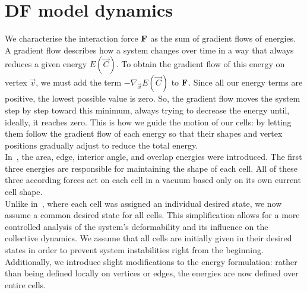 \section{DF model dynamics} 
We characterise the interaction force $\mathbf{F}$ as the sum of gradient flows of energies. \\
A gradient flow describes how a system changes over time in a way that always reduces a given energy $E(\vec{C})$.
To obtain the gradient flow of this energy on vertex $\vec{v}$, we must add the term $-\nabla_{\vec{v}} E(\vec{C})$ to $\mathbf{F}$.
Since all our energy terms are positive, the lowest possible value is zero.  
So, the gradient flow moves the system step by step toward this minimum, always trying to decrease the energy until, ideally, it reaches zero. 
This is how we guide the motion of our cells: by letting them follow the gradient flow of each energy so that their shapes and vertex positions gradually adjust to reduce the total energy. \\
In~\cite{Vogel2023}, the area, edge, interior angle, and overlap energies were introduced.
The first three energies are responsible for maintaining the shape of each cell. 
All of these three according forces act on each cell in a vacuum based only on its own current cell shape. \\
Unlike in~\cite{Vogel2023}, where each cell was assigned an individual desired state, we now assume a common desired state for all cells. This simplification allows for a more controlled analysis of the system's deformability and its influence on the collective dynamics.
We assume that all cells are initially given in their desired states in order to prevent system instabilities right from the beginning. \\
Additionally, we introduce slight modifications to the energy formulation: rather than being defined locally on vertices or edges, the energies are now defined over entire cells. 
